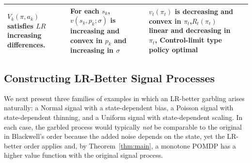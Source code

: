 \begin{landscape}
\begin{table}[h!]
\begin{tabular}{>{\bfseries}p{2.5cm} p{6.5cm} p{6.5cm} p{5.5cm}}
    $V_k(\pi, a_k)$ satisfies $LR$ increasing differences.
  & For each $s_k$, $v(s_k, p_k; \sigma)$ is increasing\newline
    and convex in $p_k$ and increasing in\newline
    $\sigma$
  & $v_t(\pi_t)$ is decreasing and convex in $\pi_t$,\newline $R_t(\pi_t)$ linear and decreasing in $\pi_t$, \newline Control-limit type policy optimal \\
\bottomrule
\end{tabular}
\end{table}
\end{landscape}

\subsection{Constructing LR-Better Signal Processes}\label{sec:examples}

We next present three families of examples in which an LR-better
garbling arises naturally: a Normal signal with a state-dependent
bias, a Poisson signal with state-dependent thinning, and a Uniform
signal with state-dependent scaling. In each case, the garbled process
would typically \emph{not} be comparable to the original in
Blackwell's order because the added noise depends on the state, yet
the LR-better order applies and, by Theorem~\ref{thm:main}, a monotone
POMDP has a higher value function with the original signal process.


